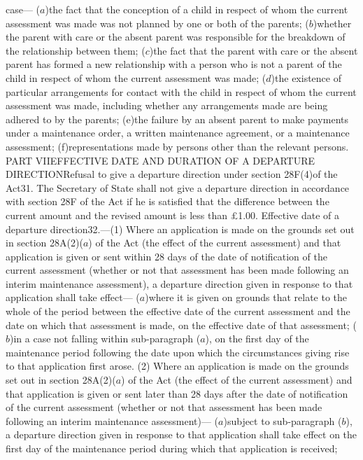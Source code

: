 \documentclass[a4paper]{article}
\begin{document}
case—
($a$)the fact that the conception of a child in respect of whom the current
assessment was made was not planned by one or both of the parents;
($b$)whether the parent with care or the absent parent was responsible for the
breakdown of the relationship between them;
($c$)the fact that the parent with care or the absent parent has formed a new
relationship with a person who is not a parent of the child in respect of whom
the current assessment was made;
($d$)the existence of particular arrangements for contact with the child in
respect of whom the current assessment was made, including whether any
arrangements made are being adhered to by the parents;
(e)the failure by an absent parent to make payments under a maintenance order, a
written maintenance agreement, or a maintenance assessment;
(f)representations made by persons other than the relevant persons.
PART VIIEFFECTIVE DATE AND DURATION OF A DEPARTURE DIRECTIONRefusal to give a
departure direction under section 28F(4)of the Act31. The Secretary of State
shall not give a departure direction in accordance with section 28F of the Act
if he is satisfied that the difference between the current amount and the
revised amount is less than £1.00.
Effective date of a departure direction32.—(1) Where an application is made on
the grounds set out in section 28A(2)($a$) of the Act (the effect of the current
assessment) and that application is given or sent within 28 days of the date of
notification of the current assessment (whether or not that assessment has been
made following an interim maintenance assessment), a departure direction given
in response to that application shall take effect—
($a$)where it is given on grounds that relate to the whole of the period between
the effective date of the current assessment and the date on which that
assessment is made, on the effective date of that assessment;
($b$)in a case not falling within sub-paragraph ($a$), on the first day of the
maintenance period following the date upon which the circumstances giving rise
to that application first arose.
(2) Where an application is made on the grounds set out in section 28A(2)($a$) of
the Act (the effect of the current assessment) and that application is given or
sent later than 28 days after the date of notification of the current assessment
(whether or not that assessment has been made following an interim maintenance
assessment)—
($a$)subject to sub-paragraph ($b$), a departure direction given in response to that
application shall take effect on the first day of the maintenance period during
which that application is received;
\end{document}
